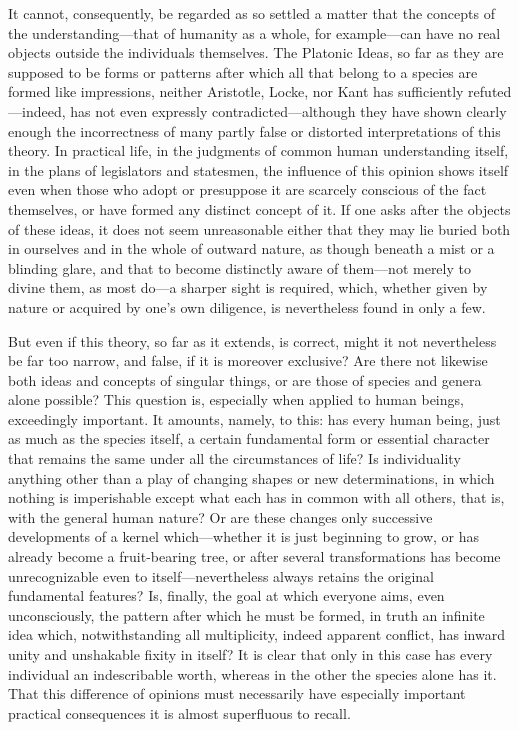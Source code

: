 \documentclass[12pt,a4paper]{article}
\begin{document}
It cannot, consequently, be regarded as so settled a matter that the concepts of
the understanding---that of humanity as a whole, for example---can have no real
objects outside the individuals themselves. The Platonic Ideas, so far as they
are supposed to be forms or patterns after which all that belong to a species
are formed like impressions, neither Aristotle, Locke, nor Kant has sufficiently
refuted---indeed, has not even expressly contradicted---although they have shown
clearly enough the incorrectness of many partly false or distorted
interpretations of this theory. In practical life, in the judgments of common
human understanding itself, in the plans of legislators and statesmen, the
influence of this opinion shows itself even when those who adopt or presuppose
it are scarcely conscious of the fact
themselves, or have formed any distinct concept of it. If one asks after the
objects of these ideas, it does not seem unreasonable either that they may lie
buried both in ourselves and in the whole of outward nature, as though beneath a
mist or a blinding glare, and that to become distinctly aware of them---not
merely to divine them, as most do---a sharper sight is required, which, whether
given by nature or acquired by one's own diligence, is nevertheless found in
only a few.

But even if this theory, so far as it extends, is correct, might it not
nevertheless be far too narrow, and false, if it is moreover exclusive? Are
there not likewise both ideas and concepts of singular things, or are those of
species and genera alone possible? This question is, especially when applied to
human beings, exceedingly important. It amounts, namely, to this: has every
human being, just as much as the species itself, a certain fundamental form or
essential character that remains the same under all the circumstances of life?
Is individuality anything other than a play of changing shapes or new
determinations, in which nothing is imperishable except what each has in common
with all others, that is, with the general human nature? Or are these changes
only successive developments of a kernel which---whether it is just beginning to
grow, or has already become a fruit-bearing tree, or after several
transformations has become unrecognizable even to itself---nevertheless always
retains the original fundamental features? Is, finally, the goal at which
everyone aims, even unconsciously, the pattern after which he must be formed, in
truth an infinite idea which, notwithstanding all multiplicity,
indeed apparent conflict, has inward unity and unshakable fixity in itself? It
is clear that only in this case has every individual an indescribable worth,
whereas in the other the species alone has it. That this difference of opinions
must necessarily have especially important practical consequences it is almost
superfluous to recall.
\end{document}
